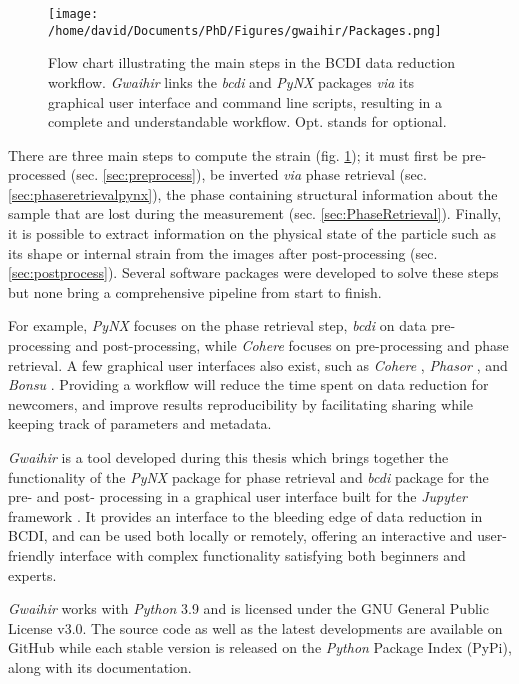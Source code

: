 \begin{figure}[!htb]
    \texttt{[image: /home/david/Documents/PhD/Figures/gwaihir/Packages.png]}
    \caption{
    Flow chart illustrating the main steps in the BCDI data reduction workflow.
    \textit{Gwaihir} links the \textit{bcdi} and \textit{PyNX} packages \textit{via} its graphical user interface and command line scripts, resulting in a complete and understandable workflow.
    Opt. stands for optional.
    }
    \label{fig:Packages}
\end{figure}

There are three main steps to compute the strain (fig. \ref{fig:Packages}); it must first be pre-processed (sec. \ref{sec:preprocess}), be inverted \textit{via} phase retrieval (sec. \ref{sec:phaseretrievalpynx}), the phase containing structural information about the sample that are lost during the measurement (sec. \ref{sec:PhaseRetrieval}).
Finally, it is possible to extract information on the physical state of the particle such as its shape or internal strain from the images after post-processing (sec. \ref{sec:postprocess}).
Several software packages were developed to solve these steps but none bring a comprehensive pipeline from start to finish.

For example, \textit{PyNX} \parencite{FavreNicolin2011} focuses on the phase retrieval step, \textit{bcdi} \parencite{Carnis2021c} on data pre-processing and post-processing, while \textit{Cohere} \parencite{Frosik2021} focuses on pre-processing and phase retrieval.
A few graphical user interfaces also exist, such as \textit{Cohere} \parencite{Frosik2021}, \textit{Phasor} \parencite{Dzhigaev2021}, and \textit{Bonsu} \parencite{Newton2012}.
Providing a workflow will reduce the time spent on data reduction for newcomers, and improve results reproducibility by facilitating sharing while keeping track of parameters and metadata.

\textit{Gwaihir} is a tool developed during this thesis which brings together the functionality of the \textit{PyNX} package for phase retrieval and \textit{bcdi} package for the pre- and post- processing in a graphical user interface built for the \textit{Jupyter} framework \parencite{Kluyver2016}.
It provides an interface to the bleeding edge of data reduction in BCDI, and can be used both locally or remotely, offering an interactive and user-friendly interface with complex functionality satisfying both beginners and experts.

\textit{Gwaihir} works with \textit{Python} 3.9 and is licensed under the GNU General Public License v3.0.
The source code as well as the latest developments are available on GitHub while each stable version is released on the \textit{Python} Package Index (PyPi), along with its documentation.

